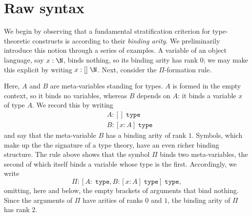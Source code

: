 \chapter{Raw syntax}
\label{ch:raw-syntax}

We begin by observing that a fundamental stratification criterion for type-theoretic constructs is according to their \textit{binding arity}. We preliminarily introduce this notion through a series of examples. A variable of an object language, say $x : \N$, binds nothing, so its binding arity has rank $0$; we may make this explicit by writing $x : [] \; \N$. 
Next, consider the $\Pi$-formation rule.
\begin{mathpar}
\end{mathpar}  
Here, $A$ and $B$ are meta-variables standing for types. $A$ is formed in the empty context, so it binds no variables, whereas $B$ depends on $A$: it binds a variable $x$ of type $A$. We record this by writing
\begin{align*}
    &A : [] \; \texttt{type}\\
    &B : [x : A] \; \texttt{type}
\end{align*}
and say that the meta-variable $B$ has a binding arity of rank $1$. Symbols, which make up the the signature of a type theory, have an even richer binding structure. The rule above shows that the symbol $\Pi$ binds two meta-variables, the second of which itself binds a variable whose type is the first. Accordingly, we write
$$\Pi : [A : \;\texttt{type}, B : [x : A] \; \texttt{type}] \; \texttt{type},$$
omitting, here and below, the empty brackets of arguments that bind nothing. Since the arguments of $\Pi$ have arities of ranks $0$ and $1$, the binding arity of $\Pi$ has rank $2$.

